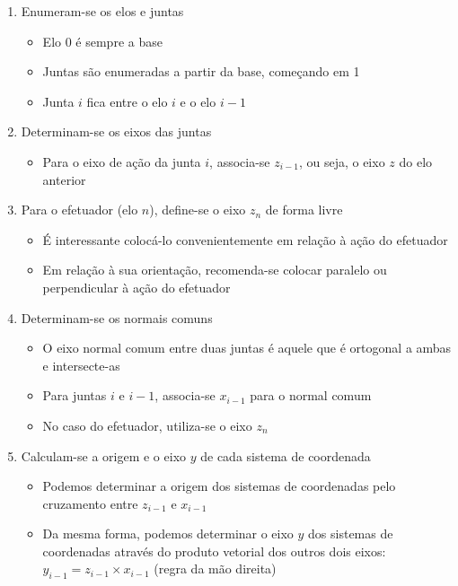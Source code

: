 \begin{enumerate}
    \item Enumeram-se os elos e juntas
	\begin{itemize}
	    \item Elo 0 é sempre a base
		\item Juntas são enumeradas a partir da base, começando em 1
		\item Junta $i$ fica entre o elo $i$ e o elo $i-1$
	\end{itemize}
    \item Determinam-se os eixos das juntas
	\begin{itemize}
	    \item Para o eixo de ação da junta $i$, associa-se $z_{i-1}$, ou seja, o eixo $z$ do elo anterior
	\end{itemize}
    \item Para o efetuador (elo $n$), define-se o eixo $z_n$ de forma livre
	\begin{itemize}
	    \item É interessante colocá-lo convenientemente em relação à ação do efetuador
	    \item Em relação à sua orientação, recomenda-se colocar paralelo ou perpendicular à ação do efetuador
	\end{itemize}
    \item Determinam-se os normais comuns
	\begin{itemize}
	    \item O eixo normal comum entre duas juntas é aquele que é ortogonal a ambas e intersecte-as
		\item Para juntas $i$ e $i-1$, associa-se $x_{i-1}$ para o normal comum
		    \item No caso do efetuador, utiliza-se o eixo $z_n$
	\end{itemize}
    \item Calculam-se a origem e o eixo $y$ de cada sistema de coordenada
	\begin{itemize}
		\item Podemos determinar a origem dos sistemas de coordenadas pelo cruzamento entre $z_{i-1}$ e $x_{i-1}$ 
		\item Da mesma forma, podemos determinar o eixo $y$ dos sistemas de coordenadas através do produto vetorial dos outros dois eixos: $y_{i-1} = z_{i-1}\times x_{i-1}$ (regra da mão direita)
	\end{itemize}
\end{enumerate}

